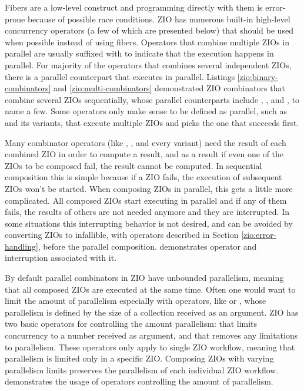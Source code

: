 Fibers are a low-level construct and programming directly with them is error-prone because of possible race conditions. ZIO has numerous built-in high-level concurrency operators (a few of which are presented below) that should be used when possible instead of using fibers. Operators that combine multiple ZIOs in parallel are usually suffixed with  to indicate that the execution happens in parallel. For majority of the operators that combines several independent ZIOs, there is a parallel counterpart that executes in parallel. Listings \ref{zio:binary-combinators} and \ref{zio:multi-combinators} demonstrated ZIO combinators that combine several ZIOs sequentially, whose parallel counterparts include , , and , to name a few. Some operators only make sense to be defined as parallel, such as  and its variants, that execute multiple ZIOs and picks the one that succeeds first.

Many combinator operators (like , , and every  variant) need the result of each combined ZIO in order to compute a result, and as a result if even one of the ZIOs to be composed fail, the result cannot be computed. In sequential composition this is simple because if a ZIO fails, the execution of subsequent ZIOs won't be started. When composing ZIOs in parallel, this gets a little more complicated. All composed ZIOs start executing in parallel and if any of them fails, the results of others are not needed anymore and they are interrupted. In some situations this interrupting behavior is not desired, and can be avoided by converting ZIOs to infallible, with operators described in Section \ref{zio:error-handling}, before the parallel composition.  demonstrates  operator and interruption associated with it.



By default parallel combinators in ZIO have unbounded parallelism, meaning that all composed ZIOs are executed at the same time. Often one would want to limit the amount of parallelism especially with operators, like  or , whose parallelism is defined by the size of a collection received as an argument. ZIO has two basic operators for controlling the amount parallelism:  that limits concurrency to a number received as argument, and  that removes any limitations to parallelism. These operators only apply to single ZIO workflow, meaning that parallelism is limited only in a specific ZIO. Composing ZIOs with varying parallelism limits preserves the parallelism of each individual ZIO workflow.  demonstrates the usage of operators controlling the amount of parallelism.



